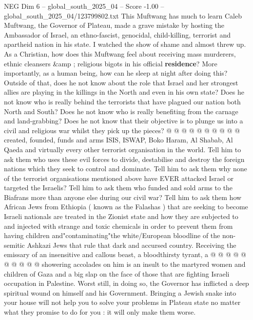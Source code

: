 \begin{textsample}{NEG Dim 6 – global\_south\_2025\_04 – Score -1.00 – global\_south\_2025\_04/123799802.txt}  \label{ex:f6_neg_172}
This Muftwang has much to learn Caleb Muftwang, the Governor of Plateau, made a grave mistake by hosting the Ambassador of Israel, an ethno-fascist, genocidal, child-killing, terrorist and apartheid nation in his state.
I watched the show of shame and almost threw up.
As a Christian, how does this Muftwang feel about receiving mass murderers, ethnic cleansers \&amp ; religious bigots in his official \textbf{residence}?
More importantly, as a human being, how can he sleep at night after doing this?
Outside of that, does he not know about the role that Israel and her strongest allies are playing in the killings in the North and even in his own state?
Does he not know who is really behind the terrorists that have plagued our nation both North and South?
Does he not know who is really benefiting from the carnage and land-grabbing?
Does he not know that their objective is to plunge us into a civil and religious war whilst they pick up the pieces? @ @ @ @ @ @ @ @ @ @ created, founded, funds and arms ISIS, ISWAP, Boko Haram, Al Shabab, Al Qaeda and virtually every other terrorist organisation in the world.
Tell him to ask them who uses these evil forces to divide, destabilise and destroy the foreign nations which they seek to control and dominate.
Tell him to ask them why none of the terrorist organisations mentioned above have EVER attacked Israel or targeted the Israelis?
Tell him to ask them who funded and sold arms to the Biafrans more than anyone else during our civil war?
Tell him to ask them how African Jews from Ethiopia ( known as the Falashas ) that are seeking to become Israeli nationals are treated in the Zionist state and how they are subjected to and injected with strange and toxic chemicals in order to prevent them from having children and"contaminating"the white/European bloodline of the non-semitic Ashkazi Jews that rule that dark and accursed country.
Receiving the emissary of an insensitive and callous beast, a bloodthirsty tyrant, a @ @ @ @ @ @ @ @ @ @ showering accolades on him is an insult to the martyred women and children of Gaza and a big slap on the face of those that are fighting Israeli occupation in Palestine.
Worst still, in doing so, the Governor has inflicted a deep spiritual wound on himself and his Government.
Bringing a Jewish snake into your house will not help you to solve your problems in Plateau state no matter what they promise to do for you : it will only make them worse.

\end{textsample}
